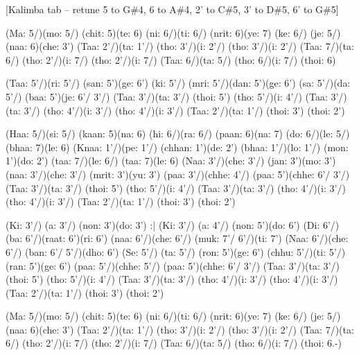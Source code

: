 \documentclass[11pt]{article}
\begin{document}
[Kalimba tab -- retune 5 to G\#4, 6 to A\#4, 2' to C\#5, 3' to D\#5, 6' to G\#5]
\begin{jianpu}
(Ma: 5/)(mo: 5/) (chit: 5)(te: 6) (ni: 6/)(ti: 6/)
(nrit: 6)(ye: 7) (ke: 6/) (je: 5/) (naa: 6)(che: 3')
(Taa: 2'/)(ta: 1'/) (tho: 3'/)(i: 2'/) (tho: 3'/)(i: 2'/)
(Taa: 7/)(ta: 6/) (tho: 2'/)(i: 7/) (tho: 2'/)(i: 7/)
(Taa: 6/)(ta: 5/) (tho: 6/)(i: 7/) (thoi: 6)

(Taa: 5'/)(ri: 5'/) (san: 5')(ge: 6') (ki: 5'/)
(mri: 5'/)(dan: 5')(ge: 6') (sa: 5'/)(da: 5'/) (baa: 5')(je: 6'/ 3'/)
(Taa: 3'/)(ta: 3'/) (thoi: 5') (tho: 5'/)(i: 4'/)
(Taa: 3'/)(ta: 3'/) (tho: 4'/)(i: 3'/) (tho: 4'/)(i: 3'/)
(Taa: 2'/)(ta: 1'/) (thoi: 3') (thoi: 2')

(Haa: 5/)(si: 5/) (kaan: 5)(na: 6) (hi: 6/)(ra: 6/)
(paan: 6)(na: 7) (do: 6/)(le: 5/) (bhaa: 7)(le: 6)
(Knaa: 1'/)(pe: 1'/) (chhan: 1')(de: 2') (bhaa: 1'/)(lo: 1'/)
(mon: 1')(do: 2') (taa: 7/)(le: 6/) (taa: 7)(le: 6)
(Naa: 3'/)(che: 3'/) (jan: 3')(mo: 3') (naa: 3'/)(che: 3'/)
(mrit: 3')(yu: 3') (paa: 3'/)(chhe: 4'/) (paa: 5')(chhe: 6'/ 3'/)
(Taa: 3'/)(ta: 3'/) (thoi: 5') (tho: 5'/)(i: 4'/)
(Taa: 3'/)(ta: 3'/) (tho: 4'/)(i: 3'/) (tho: 4'/)(i: 3'/)
(Taa: 2'/)(ta: 1'/) (thoi: 3') (thoi: 2')

(Ki: 3'/) (a: 3'/) (non: 3')(do: 3') :|
(Ki: 3'/) (a: 4'/) (non: 5')(do: 6')
(Di: 6'/)(ba: 6'/)(raat: 6')(ri: 6') (naa: 6'/)(che: 6'/) (muk: 7'/ 6'/)(ti: 7')
(Naa: 6'/)(che: 6'/) (ban: 6'/ 5'/)(dho: 6')
(Se: 5'/) (ta: 5'/) (ron: 5')(ge: 6') (chhu: 5'/)(ti: 5'/)
(ran: 5')(ge: 6') (paa: 5'/)(chhe: 5'/) (paa: 5')(chhe: 6'/ 3'/)
(Taa: 3'/)(ta: 3'/) (thoi: 5') (tho: 5'/)(i: 4'/)
(Taa: 3'/)(ta: 3'/) (tho: 4'/)(i: 3'/) (tho: 4'/)(i: 3'/)
(Taa: 2'/)(ta: 1'/) (thoi: 3') (thoi: 2')

(Ma: 5/)(mo: 5/) (chit: 5)(te: 6) (ni: 6/)(ti: 6/)
(nrit: 6)(ye: 7) (ke: 6/) (je: 5/) (naa: 6)(che: 3')
(Taa: 2'/)(ta: 1'/) (tho: 3'/)(i: 2'/) (tho: 3'/)(i: 2'/)
(Taa: 7/)(ta: 6/) (tho: 2'/)(i: 7/) (tho: 2'/)(i: 7/)
(Taa: 6/)(ta: 5/) (tho: 6/)(i: 7/) (thoi: 6.-)
\end{jianpu}
\end{document}

